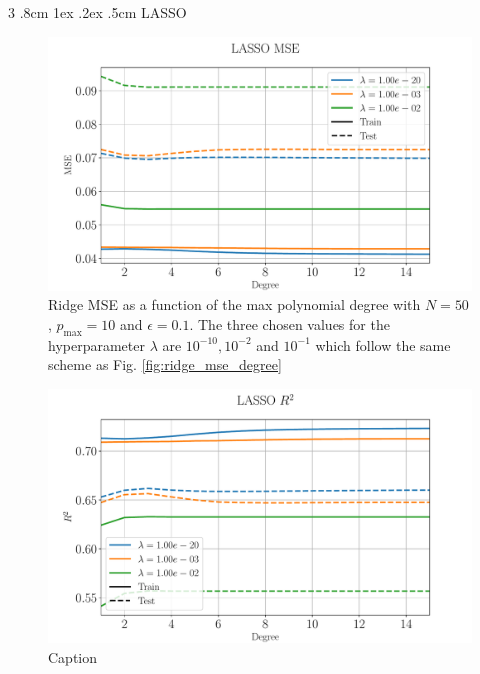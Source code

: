 \documentclass[%
reprint,
amsmath,amssymb,
aps,
pra,
]{revtex4-2}
\makeatletter
\renewcommand{\subsubsection}{%
	\@startsection
	{subsubsection}%
	{3}%
	{\z@}%
	{.8cm \@plus1ex \@minus .2ex}%
	{.5cm}%
	{\normalfont\small\centering}%
}
\makeatother
\begin{document}
\subsubsection{LASSO}
\begin{figure}[H]
	\centering
	\includegraphics[width=\linewidth]{Python/Figures/LASSO/LASSO_MSE_no_scaling.pdf}
	\caption{Ridge MSE as a function of the max polynomial degree with \(N=50\), \(p_{\text{max}}=10\) and \(\epsilon=0.1\). The three chosen values for the hyperparameter $\lambda$ are $10^{-10},10^{-2}$ and $10^{-1}$ which follow the same scheme as Fig. \ref{fig:ridge_mse_degree}}
	\label{fig:lasso_mse_degree}
\end{figure}
\begin{figure}[H]
	\centering
	\includegraphics[width=\linewidth]{Python/Figures/LASSO/LASSO_R2_no_scaling.pdf}
	\caption{Caption}
	\label{fig:lasso_r2_degree}
\end{figure}
\end{document}
